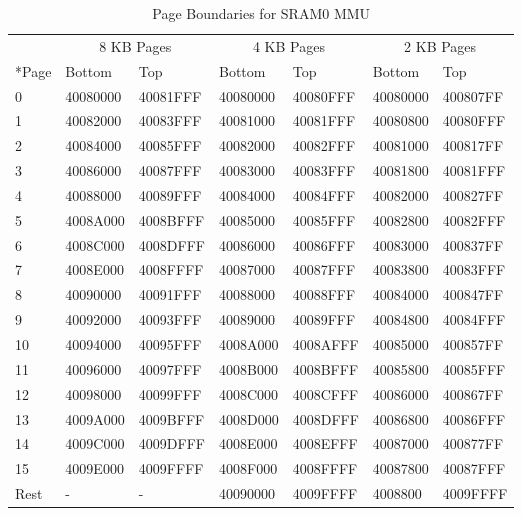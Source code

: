 \begin{table}[H]
    \centering
    \caption{Page Boundaries for SRAM0 MMU}
    \label{table:Page_Boundaries_SRAM0_MMU}
    \begin{tabular}[h]{ |p{1.5cm}|p{2cm}|p{2cm}|p{2cm}|p{2cm}|p{2cm}|p{2cm}|}
        \hline
        \rowcolor{lightgray}
        & \multicolumn{2}{c|}{8 KB Pages} & \multicolumn{2}{c|}{4 KB Pages} & \multicolumn{2}{c|}{2 KB Pages} \\
        \cline{2-6}
        \rowcolor{lightgray}
        \multirow{-2}*{Page} & Bottom & Top & Bottom & Top & Bottom & Top \\
        \hline
 	0 & 40080000 & 40081FFF & 40080000 & 40080FFF & 40080000 & 400807FF \\ \hline
	1 & 40082000 & 40083FFF & 40081000 & 40081FFF & 40080800 & 40080FFF \\ \hline
	2 & 40084000 & 40085FFF & 40082000 & 40082FFF & 40081000 & 400817FF \\ \hline
	3 & 40086000 & 40087FFF & 40083000 & 40083FFF & 40081800 & 40081FFF \\ \hline
	4 & 40088000 & 40089FFF & 40084000 & 40084FFF & 40082000 & 400827FF \\ \hline
	5 & 4008A000 & 4008BFFF & 40085000 & 40085FFF & 40082800 & 40082FFF \\ \hline
	6 & 4008C000 & 4008DFFF & 40086000 & 40086FFF & 40083000 & 400837FF \\ \hline
	7 & 4008E000 & 4008FFFF & 40087000 & 40087FFF & 40083800 & 40083FFF \\ \hline
	8 & 40090000 & 40091FFF & 40088000 & 40088FFF & 40084000 & 400847FF \\ \hline
	9 & 40092000 & 40093FFF & 40089000 & 40089FFF & 40084800 & 40084FFF \\ \hline
	10 & 40094000 & 40095FFF & 4008A000 & 4008AFFF & 40085000 & 400857FF \\ \hline
	11 & 40096000 & 40097FFF & 4008B000 & 4008BFFF & 40085800 & 40085FFF \\ \hline
	12 & 40098000 & 40099FFF & 4008C000 & 4008CFFF & 40086000 & 400867FF \\ \hline
	13 & 4009A000 & 4009BFFF & 4008D000 & 4008DFFF & 40086800 & 40086FFF \\ \hline
	14 & 4009C000 & 4009DFFF & 4008E000 & 4008EFFF & 40087000 & 400877FF \\ \hline
	15 & 4009E000 & 4009FFFF & 4008F000 & 4008FFFF & 40087800 & 40087FFF \\ \hline
	Rest & - & - & 40090000 & 4009FFFF & 4008800 & 4009FFFF \\ \hline
    \end{tabular}
\end{table}


